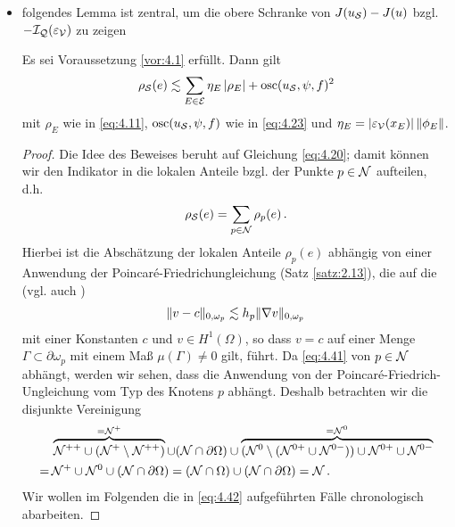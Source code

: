 \begin{itemize}
\begin{proof}
Beweis machen???
\end{proof}


\item folgendes Lemma ist zentral, um die obere Schranke von $J(u_{\mathcal S})-J(u)$ bzgl. $-\mathcal I_{\mathcal Q}(\varepsilon_{\mathcal V})$ zu zeigen

\begin{lemma}\label{lem:4.19}
Es sei Voraussetzung \ref{vor:4.1} erfüllt. Dann gilt
\begin{align}
	\rho_{\mathcal S}(e) \lesssim \sum_{E\in \mathcal E} \eta_E \, \lvert \rho_E\rvert + \operatorname{osc}(u_{\mathcal S},\psi,f)^2 
\end{align}
mit $\rho_E$ wie in \eqref{eq:4.11}, $\operatorname{osc} (u_{\mathcal S},\psi,f)$ wie in \eqref{eq:4.23} und $\eta_E = \lvert \varepsilon_{\mathcal V}(x_E)\rvert \, \lVert \phi_E\rVert$.
\end{lemma}

\begin{proof}
Die Idee des Beweises beruht auf Gleichung \eqref{eq:4.20}; damit können wir den Indikator in die lokalen Anteile bzgl. der Punkte $p \in \mathcal N$ aufteilen, d.h.
\begin{align}\label{eq:4.40}
	\rho_{\mathcal S} (e) = \sum_{p \in \mathcal N} \rho_p (e) \, .
\end{align}
Hierbei ist die Abschätzung der lokalen Anteile $\rho_p(e)$ abhängig von einer Anwendung der Poincaré-Friedrichungleichung (Satz \ref{satz:2.13}), die auf die \textit{} (vgl. auch \cite{Rudin})
\begin{align}\label{eq:4.41}
	\lVert v-c\rVert_{0,\omega_p} \lesssim h_p \lVert \nabla v\rVert_{0,\omega_p}
\end{align}
mit einer Konstanten $c$ und $v\in H^1(\Omega)$, so dass $v=c$ auf einer Menge $\Gamma \subset \partial \omega_p$ mit einem Maß $\mu (\Gamma)\not= 0$ gilt, führt. Da \eqref{eq:4.41} von $p\in \mathcal N$ abhängt, werden wir sehen, dass die Anwendung von der Poincaré-Friedrich-Ungleichung vom Typ des Knotens $p$ abhängt. Deshalb betrachten wir die disjunkte Vereinigung
\begin{align}\label{eq:4.42}
\begin{aligned}
	& \overbrace{\mathcal N^{++} \cup (\mathcal N^+ \setminus \mathcal N^{++})}^{=\mathcal N^+} \cup (\mathcal N \cap \partial \Omega ) \cup\overbrace{ (\mathcal N^0 \setminus (\mathcal N^{0+} \cup \mathcal N^{0-}))  \cup \mathcal N^{0+} \cup \mathcal N^{0-}}^{= \mathcal N^0} \\
	= \, & \mathcal N^+ \cup \mathcal N^0 \cup (\mathcal N \cap \partial \Omega)  = (\mathcal N \cap \Omega) \cup (\mathcal N \cap \partial \Omega) = \mathcal N \, .
\end{aligned}
\end{align}
Wir wollen im Folgenden die in \eqref{eq:4.42} aufgeführten Fälle chronologisch abarbeiten.


\end{proof}
\end{itemize}
